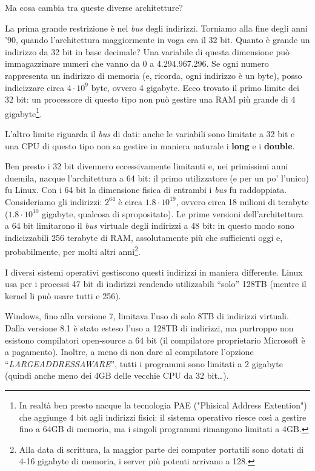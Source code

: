 \begin{subappendices}
Ma cosa cambia tra queste diverse architetture? 

La prima grande restrizione è nel \emph{bus} degli indirizzi. Torniamo alla fine degli anni '90, quando l'architettura maggiormente in voga era il 32 bit. Quanto è grande un indirizzo da 32 bit in base decimale? Una variabile di questa dimensione può immagazzinare numeri che vanno da 0 a 4.294.967.296. Se ogni numero rappresenta un indirizzo di memoria (e, ricorda, ogni indirizzo è un byte), posso indicizzare circa $4\cdot10^9$ byte, ovvero 4 gigabyte. Ecco trovato il primo limite dei 32 bit: un processore di questo tipo non può gestire una RAM più grande di 4 gigabyte\footnote{In realtà ben presto nacque la tecnologia PAE ("Phisical Address Extention") che aggiunge 4 bit agli indirizzi fisici: il sistema operativo riesce così a gestire fino a 64GB di memoria, ma i singoli programmi rimangono limitati a 4GB.}. 

L'altro limite riguarda il \emph{bus} di dati: anche le variabili sono limitate a 32 bit e una CPU di questo tipo non sa gestire in maniera naturale i \textbf{long} e i \textbf{double}.

Ben presto i 32 bit divennero eccessivamente limitanti e, nei primissimi anni duemila, nacque l'architettura a 64 bit:  il primo utilizzatore (e per un po' l'unico) fu Linux. Con i 64 bit la dimensione fisica di entrambi i \emph{bus} fu raddoppiata. Consideriamo gli indirizzi: $2^{64}$ è circa $1.8\cdot10^{19}$, ovvero circa 18 milioni di terabyte ($1.8\cdot10^{10}$ gigabyte, qualcosa di spropositato). Le prime versioni dell'architettura a 64 bit limitarono il \emph{bus} virtuale degli indirizzi a 48 bit: in questo modo sono indicizzabili 256 terabyte di RAM, assolutamente più che sufficienti oggi e, probabilmente, per molti altri anni\footnote{Alla data di scrittura, la maggior parte dei computer portatili sono dotati di 4-16 gigabyte di memoria, i server più potenti arrivano a 128.}.

I diversi sistemi operativi gestiscono questi indirizzi in maniera differente. Linux usa per i processi  47 bit di indirizzi rendendo utilizzabili ``solo'' 128TB (mentre il kernel li può usare tutti e 256). 

Windows, fino alla versione 7, limitava l'uso di solo 8TB di indirizzi virtuali. Dalla versione 8.1 è stato esteso l'uso a 128TB di indirizzi, ma purtroppo non esistono compilatori open-source a 64 bit (il compilatore proprietario Microsoft è a pagamento). Inoltre, a meno di non dare al compilatore l'opzione ``\emph{LARGEADDRESSAWARE}'', tutti i programmi sono limitati a 2 gigabyte (quindi anche meno dei 4GB delle  vecchie CPU da 32 bit\ldots). 


\end{subappendices}
